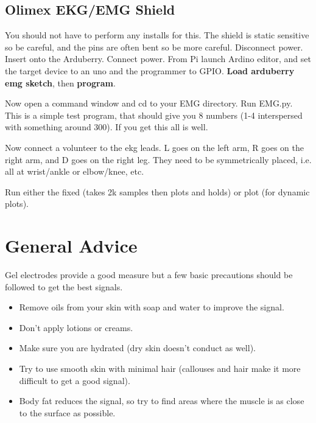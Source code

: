 \subsection{Olimex EKG/EMG Shield}

You should not have to perform any installs for this.  The shield is static sensitive so be careful, and the pins are often bent so be more careful.  Disconnect power.  Insert onto the Arduberry. Connect power.  From Pi launch Ardino editor, and set the target device to an uno and the programmer to GPIO. \textbf{Load arduberry emg sketch}, then \textbf{program}.

Now open a command window and cd to your EMG directory.  Run EMG.py.  This is a simple test program, that should give you 8 numbers (1-4 interspersed with something around 300).  If you get this all is well.

Now connect a volunteer to the ekg leads.  L goes on the left arm, R goes on the right arm, and D goes on the right leg.  They need to be symmetrically placed, i.e. all at wrist/ankle or elbow/knee, etc.

Run either the fixed (takes 2k samples then plots and holds) or plot (for dynamic plots).

\section{General Advice}

Gel electrodes provide a good measure but a few basic precautions should be followed to get the best signals.

\begin{itemize}
  \item Remove oils from your skin with soap and water to improve the signal.
  \item Don't apply lotions or creams.
  \item Make sure you are hydrated (dry skin doesn't conduct as well).
  \item Try to use smooth skin with minimal hair (callouses and hair make it more difficult to get a good signal).
  \item Body fat reduces the signal, so try to find areas where the muscle is as close to the surface as possible.
\end{itemize}